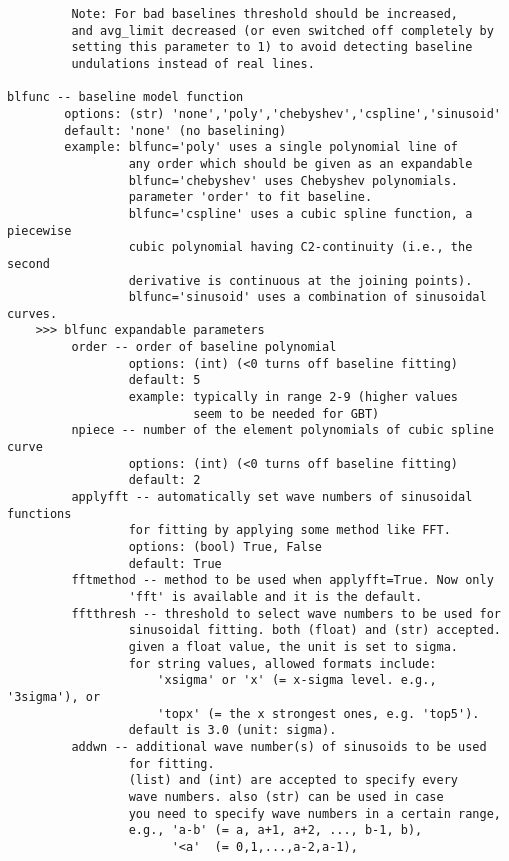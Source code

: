 \begin{verbatim}
         Note: For bad baselines threshold should be increased,
         and avg_limit decreased (or even switched off completely by
         setting this parameter to 1) to avoid detecting baseline
         undulations instead of real lines.

blfunc -- baseline model function
        options: (str) 'none','poly','chebyshev','cspline','sinusoid'
        default: 'none' (no baselining)
        example: blfunc='poly' uses a single polynomial line of 
                 any order which should be given as an expandable 
                 blfunc='chebyshev' uses Chebyshev polynomials. 
                 parameter 'order' to fit baseline. 
                 blfunc='cspline' uses a cubic spline function, a piecewise 
                 cubic polynomial having C2-continuity (i.e., the second 
                 derivative is continuous at the joining points).
                 blfunc='sinusoid' uses a combination of sinusoidal curves. 
    >>> blfunc expandable parameters
         order -- order of baseline polynomial
                 options: (int) (<0 turns off baseline fitting)
                 default: 5
                 example: typically in range 2-9 (higher values
                          seem to be needed for GBT)
         npiece -- number of the element polynomials of cubic spline curve
                 options: (int) (<0 turns off baseline fitting)
                 default: 2
         applyfft -- automatically set wave numbers of sinusoidal functions
                 for fitting by applying some method like FFT.
                 options: (bool) True, False
                 default: True
         fftmethod -- method to be used when applyfft=True. Now only
                 'fft' is available and it is the default.
         fftthresh -- threshold to select wave numbers to be used for
                 sinusoidal fitting. both (float) and (str) accepted.
                 given a float value, the unit is set to sigma.
                 for string values, allowed formats include:
                     'xsigma' or 'x' (= x-sigma level. e.g., '3sigma'), or
                     'topx' (= the x strongest ones, e.g. 'top5').
                 default is 3.0 (unit: sigma).
         addwn -- additional wave number(s) of sinusoids to be used
                 for fitting.
                 (list) and (int) are accepted to specify every
                 wave numbers. also (str) can be used in case
                 you need to specify wave numbers in a certain range,
                 e.g., 'a-b' (= a, a+1, a+2, ..., b-1, b),
                       '<a'  (= 0,1,...,a-2,a-1),

\end{verbatim}
